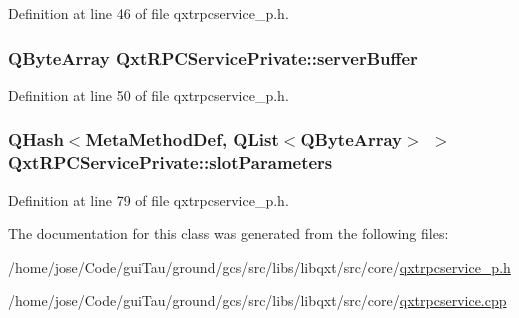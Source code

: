 Definition at line 46 of file qxtrpcservice\-\_\-p.\-h.

\hypertarget{class_qxt_r_p_c_service_private_aa4745c217565ea25afa843e6d2393f38}{
\subsubsection[{server\-Buffer}]{\setlength{\rightskip}{0pt plus 5cm}Q\-Byte\-Array Qxt\-R\-P\-C\-Service\-Private\-::server\-Buffer}}\label{class_qxt_r_p_c_service_private_aa4745c217565ea25afa843e6d2393f38}


Definition at line 50 of file qxtrpcservice\-\_\-p.\-h.

\hypertarget{class_qxt_r_p_c_service_private_acea466106d8c44ec5377d203d0fb4a5d}{
\subsubsection[{slot\-Parameters}]{\setlength{\rightskip}{0pt plus 5cm}Q\-Hash$<${\bf Meta\-Method\-Def}, {\bf Q\-List}$<$Q\-Byte\-Array$>$ $>$ Qxt\-R\-P\-C\-Service\-Private\-::slot\-Parameters}}\label{class_qxt_r_p_c_service_private_acea466106d8c44ec5377d203d0fb4a5d}


Definition at line 79 of file qxtrpcservice\-\_\-p.\-h.



The documentation for this class was generated from the following files\-:\begin{DoxyCompactItemize}
\item 
/home/jose/\-Code/gui\-Tau/ground/gcs/src/libs/libqxt/src/core/\hyperlink{qxtrpcservice__p_8h}{qxtrpcservice\-\_\-p.\-h}\item 
/home/jose/\-Code/gui\-Tau/ground/gcs/src/libs/libqxt/src/core/\hyperlink{qxtrpcservice_8cpp}{qxtrpcservice.\-cpp}\end{DoxyCompactItemize}
